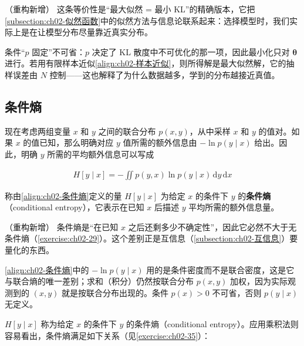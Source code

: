 \documentclass[../../main.tex]{subfiles}
\begin{document}
\begin{remark}（重构新增）
这条等价性是“最大似然 = 最小 KL”的精确版本，它把\cref{subsection:ch02-似然函数}中的似然方法与信息论联系起来：选择模型时，我们实际上是在让模型分布尽量靠近真实分布。

条件“$p$ 固定”不可省：$p$ 决定了 KL 散度中不可优化的那一项，因此最小化只对 $\boldsymbol{\theta}$ 进行。若用有限样本近似\eqref{align:ch02-样本近似}，则所得解是最大似然解，它的抽样误差由 $N$ 控制——这也解释了为什么数据越多，学到的分布越接近真值。
\end{remark}

\subsection{条件熵}\label{subsection:ch02-条件熵}

现在考虑两组变量 $x$ 和 $y$ 之间的联合分布 $p(x,y)$，从中采样 $x$ 和 $y$ 的值对。如果 $x$ 的值已知，那么明确对应 $y$ 值所需的额外信息由 $-\ln p(y\mid x)$ 给出。因此，明确 $y$ 所需的平均额外信息可以写成

\begin{align}
  H[y\mid x] = -\iint p(y,x)\ln p(y\mid x)\,\mathrm{d}y\,\mathrm{d}x
  \label{align:ch02-条件熵}
\end{align}

\begin{definition}[条件熵]\label{definition:ch02-条件熵}
称由\eqref{align:ch02-条件熵}定义的量 $H[y\mid x]$ 为给定 $x$ 的条件下 $y$ 的\textbf{条件熵}（conditional entropy），它表示在已知 $x$ 后描述 $y$ 平均所需的额外信息量。
\end{definition}

\begin{remark}（重构新增）
条件熵是“在已知 $x$ 之后还剩多少不确定性”，因此它必然不大于无条件熵（\cref{exercise:ch02-29}）。这个差别正是互信息（\cref{subsection:ch02-互信息}）要量化的东西。

\eqref{align:ch02-条件熵}中的 $-\ln p(y\mid x)$ 用的是条件密度而不是联合密度，这是它与联合熵的唯一差别；求和（积分）仍然按联合分布 $p(x,y)$ 加权，因为实际观测到的 $(x,y)$ 就是按联合分布出现的。条件 $p(x)>0$ 不可省，否则 $p(y\mid x)$ 无定义。
\end{remark}

$H[y\mid x]$ 称为给定 $x$ 的条件下 $y$ 的条件熵（conditional entropy）。应用乘积法则容易看出，条件熵满足如下关系（见\cref{exercise:ch02-35}）：
\end{document}
